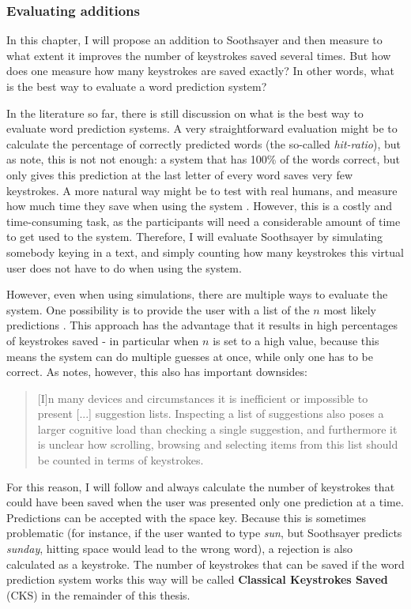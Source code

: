 \documentclass[12pt]{article}
\begin{document}
\subsubsection{Evaluating additions} \label{evaluation}
In this chapter, I will propose an addition to Soothsayer and then measure to what extent it improves the number of keystrokes saved several times. But how does one measure how many keystrokes are saved exactly? In other words, what is the best way to evaluate a word prediction system?

In the literature so far, there is still discussion on what is the best way to evaluate word prediction systems. A very straightforward evaluation might be to calculate the percentage of correctly predicted words (the so-called \emph{hit-ratio}), but as  note, this is not not enough: a system that has 100\% of the words correct, but only gives this prediction at the last letter of every word saves very few keystrokes. A more natural way might be to test with real humans, and measure how much time they save when using the system . However, this is a costly and time-consuming task, as the participants will need a considerable amount of time to get used to the system. Therefore, I will evaluate Soothsayer by simulating somebody keying in a text, and simply counting how many keystrokes this virtual user does not have to do when using the system. 

However, even when using simulations, there are multiple ways to evaluate the system. One possibility is to provide the user with a list of the $n$ most likely predictions \cite{Lesher+99,Fazly+03}. This approach has the advantage that it results in high percentages of keystrokes saved - in particular when $n$ is set to a high value, because this means the system can do multiple guesses at once, while only one has to be correct. As  notes, however, this also has important downsides: 

\begin{quotation}
[I]n many devices and circumstances it is inefficient or impossible to present [...] suggestion lists. Inspecting a list of suggestions also poses a larger cognitive load than checking a single suggestion, and furthermore it is unclear how scrolling, browsing and selecting items from this list should be counted in terms of keystrokes.
\end{quotation}

For this reason, I will follow  and always calculate the number of keystrokes that could have been saved when the user was presented only one prediction at a time. Predictions can be accepted with the space key. Because this is sometimes problematic (for instance, if the user wanted to type \emph{sun}, but Soothsayer predicts \emph{sunday}, hitting space would lead to the wrong word), a rejection is also calculated as a keystroke. The number of keystrokes that can be saved if the word prediction system works this way will be called \textbf{Classical Keystrokes Saved} (CKS) in the remainder of this thesis.
\end{document}

